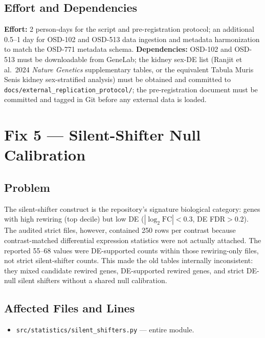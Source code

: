 \documentclass[11pt]{article}
\newcommand{\code}[1]{\texttt{#1}}
\begin{document}
\subsection{Effort and Dependencies}

\textbf{Effort:} 2 person-days for the script and pre-registration protocol; an additional 0.5--1 day for OSD-102 and OSD-513 data ingestion and metadata harmonization to match the OSD-771 metadata schema. \textbf{Dependencies:} OSD-102 and OSD-513 must be downloadable from GeneLab; the kidney sex-DE list (Ranjit et al.\ 2024 \emph{Nature Genetics} supplementary tables, or the equivalent Tabula Muris Senis kidney sex-stratified analysis) must be obtained and committed to \code{docs/external\_replication\_protocol/}; the pre-registration document must be committed and tagged in Git before any external data is loaded.

\section{Fix 5 --- Silent-Shifter Null Calibration}

\subsection{Problem}

The silent-shifter construct is the repository's signature biological category: genes with high rewiring (top decile) but low DE ($|\log_2\mathrm{FC}|<0.3$, DE FDR$>0.2$). The audited strict files, however, contained 250 rows per contrast because contrast-matched differential expression statistics were not actually attached. The reported 55--68 values were DE-supported counts within those rewiring-only files, not strict silent-shifter counts. This made the old tables internally inconsistent: they mixed candidate rewired genes, DE-supported rewired genes, and strict DE-null silent shifters without a shared null calibration.

\subsection{Affected Files and Lines}

\begin{itemize}[leftmargin=*]
\item \code{src/statistics/silent\_shifters.py} --- entire module.
\end{itemize}
\end{document}
